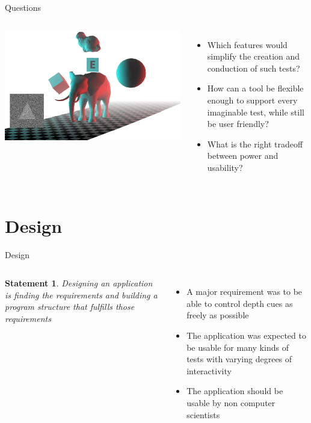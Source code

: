 \documentclass[12pt,ucs,hyperref={pdftext}]{beamer}
\newtheorem{statement}{Statement}
\newlength{\columnleft}
\newlength{\columnright}
\begin{document}
\begin{frame}{Questions}
\begin{columns}

\column{\columnleft}
\includegraphics[width=\columnleft]{media/title.png}

\column{\columnright}
\begin{itemize}%
\item Which features would simplify the creation and conduction of such tests?
\item How can a tool be flexible enough to support every imaginable test, while still be user friendly?
\item What is the right tradeoff between power and usability?
\end{itemize}

\end{columns}
\end{frame}


\section{Design}

\begin{frame}{Design}
\begin{columns}

\column{\columnleft}

\begin{statement}
Designing an application is finding the requirements and building a program structure that fulfills those requirements
\end{statement}

\column{\columnright}
\begin{itemize}%
\item A major requirement was to be able to control depth cues as freely as possible
\item The application was expected to be usable for many kinds of tests with varying degrees of interactivity
\item The application should be usable by non computer scientists
\end{itemize}

\end{columns}
\end{frame}
\end{document}
